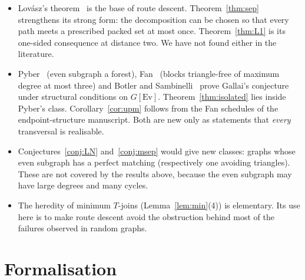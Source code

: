 \documentclass[11pt]{amsart}
\theoremstyle{definition}
\newcommand{\Ev}{\mathrm{Ev}}
\begin{document}
\begin{itemize}
\item Lov\'asz's theorem~\cite{L68} is the base of route descent. Theorem~\ref{thm:sep} strengthens its
strong form: the decomposition can be chosen so that every path meets a prescribed packed set at most
once. Theorem~\ref{thm:L1} is its one-sided consequence at distance two. We have not found either in
the literature.
\item Pyber~\cite{Pyb96} (even subgraph a forest), Fan~\cite{Fan05} (blocks triangle-free of maximum
degree at most three) and Botler and Sambinelli~\cite{BS21} prove Gallai's conjecture under structural
conditions on $G[\Ev]$. Theorem~\ref{thm:isolated} lies inside Pyber's class. Corollary~\ref{cor:upm}
follows from the Fan schedules of the endpoint-structure manuscript. Both are new only as statements that
\emph{every} transversal is realisable.
\item Conjectures~\ref{conj:LN} and~\ref{conj:msep} would give new classes: graphs whose even subgraph has
a perfect matching (respectively one avoiding triangles). These are not covered by the results above,
because the even subgraph may have large degrees and many cycles.
\item The heredity of minimum $T$-joins (Lemma~\ref{lem:min}(4)) is elementary. Its use here is to make
route descent avoid the obstruction behind most of the failures observed in random graphs.
\end{itemize}

\section{Formalisation}\label{sec:lean}
\end{document}
